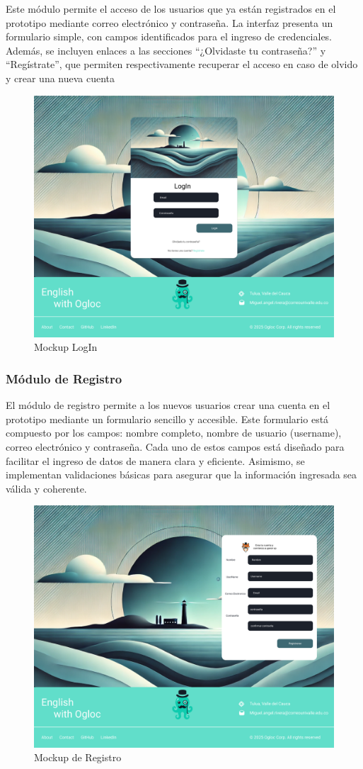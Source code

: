 Este módulo permite el acceso de los usuarios que ya están registrados en el prototipo mediante correo electrónico y contraseña. La interfaz presenta un formulario simple, con campos identificados para el ingreso de credenciales. Además, se incluyen enlaces a las secciones “¿Olvidaste tu contraseña?” y “Regístrate”, que permiten respectivamente recuperar el acceso en caso de olvido y crear una nueva cuenta

\begin{figure}[H]
  \centering
  \includegraphics[width=0.8\linewidth]{Imagenes/Vista login.png}
  \caption{Mockup LogIn}
  \label{fig:ER}
\end{figure}

\subsubsection{Módulo de Registro}

El módulo de registro permite a los nuevos usuarios crear una cuenta en el prototipo mediante un formulario sencillo y accesible. Este formulario está compuesto por los campos: nombre completo, nombre de usuario (username), correo electrónico y contraseña. Cada uno de estos campos está diseñado para facilitar el ingreso de datos de manera clara y eficiente. Asimismo, se implementan validaciones básicas para asegurar que la información ingresada sea válida y coherente.

\begin{figure}[H]
  \centering
  \includegraphics[width=0.6\linewidth]{Imagenes/Vista Registro.png}
  \caption{Mockup de Registro}
  \label{fig:ER}
\end{figure}


